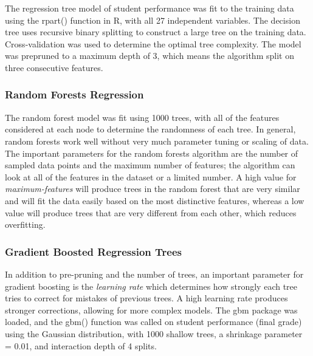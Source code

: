 \documentclass[sigconf]{acmart}
\begin{document}
The regression tree model of student performance was fit to the training data 
using the rpart() function in R, with all 27 independent variables. The decision
tree uses recursive binary splitting to construct a large tree on the 
training data. Cross-validation was used to determine the optimal tree complexity.
The model was prepruned to a maximum depth of 3, which means the algorithm split 
on three consecutive features.


\subsubsection{Random Forests Regression} 

The random forest model was fit using 1000 trees, with all of the features 
considered at each node to determine the randomness of each tree. In general,
random forests work well without very much parameter tuning or scaling of data. 
The important parameters for the random forests algorithm are the number of 
sampled data points and the maximum number of features; the algorithm can 
look at all of the features in the dataset or a limited number. A high value 
for \emph{maximum-features} will produce trees in the random forest that are 
very similar and will fit the data easily based on the most distinctive features, 
whereas a low value will produce trees that are very different from each other, 
which reduces overfitting. 


\subsubsection{Gradient Boosted Regression Trees} 

In addition to pre-pruning and the number of trees, an important parameter 
for gradient boosting is the \emph{learning rate} which determines how 
strongly each tree tries to correct for mistakes of previous trees. A high 
learning rate produces stronger corrections, allowing for more complex models. 
The gbm package was loaded, and the gbm() function was called on student
performance (final grade) using the Gaussian distribution, with 1000 shallow 
trees, a shrinkage parameter = 0.01, and interaction depth of 4 splits. 

\end{document}
